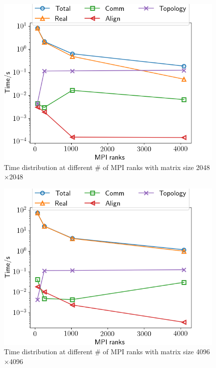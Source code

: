 \documentclass[conference]{IEEEtran}
\begin{document}
\begin{figure}[!h]
    \centering
    \includegraphics[scale=0.4]{Figures/cannon/time_distribute_2048.png}
    \caption{ Time distribution at different \# of MPI ranks with matrix size 2048$\times$2048}
    \label{cannon_distb_2048}
\end{figure}

\begin{figure}[!h]
    \centering
    \includegraphics[scale=0.4]{Figures/cannon/time_distribute_4096.png}
    \caption{ Time distribution at different \# of MPI ranks with matrix size 4096$\times$4096}
    \label{cannon_distb_4096}
\end{figure}
\end{document}
